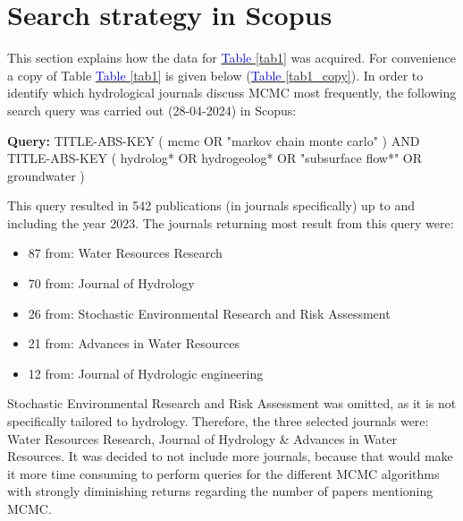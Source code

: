 \section{Search strategy in Scopus}\label{appendix search strat}
This section explains how the data for \hyperref[tab1]{\textcolor{blue}{Table }\ref{tab1}} was acquired. For convenience a copy of Table \hyperref[tab1]{\textcolor{blue}{Table }\ref{tab1}} is given below (\hyperref[tab1_copy]{\textcolor{blue}{Table }\ref{tab1_copy}}). In order to identify which hydrological journals discuss MCMC most frequently, the following search query was carried out (28-04-2024) in Scopus: 
\vspace{0.35cm} %
\begin{mdframed}
\textbf{Query:} TITLE-ABS-KEY ( mcmc OR "markov chain monte carlo" ) AND TITLE-ABS-KEY ( hydrolog* OR hydrogeolog* OR "subsurface flow*" OR groundwater ) 
\end{mdframed} 
\vspace{0.35cm} %
This query resulted in 542 publications (in journals specifically) up to and including the year 2023. The journals returning most result from this query were:
\begin{itemize}
    \item 87 from: Water Resources Research
    \item 70 from: Journal of Hydrology
    \item 26 from: Stochastic Environmental Research and Risk Assessment
    \item 21 from: Advances in Water Resources
    \item 12 from: Journal of Hydrologic engineering
\end{itemize}

Stochastic Environmental Research and Risk Assessment was omitted, as it is not specifically tailored to hydrology. Therefore, the three selected journals were: Water Resources Research, Journal of Hydrology \& Advances in Water Resources. It was decided to not include more journals, because that would make it more time consuming to perform queries for the different MCMC algorithms with strongly diminishing returns regarding the number of papers mentioning MCMC. 


